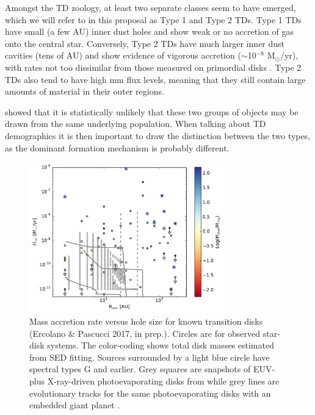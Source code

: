 \documentclass[10pt,fleqn,twoside]{article}
\begin{document}
\begin{highlight}
Amongst the TD zoology, at least two separate classes seem
to have emerged, which we will refer to in this proposal as Type 1 and
Type 2 TDs. Type 1 TDs have small (a few AU) inner dust holes and show weak or no accretion of
gas onto the central star. Conversely, Type
2 TDs have much larger inner dust cavities (tens of AU) and show evidence of vigorous accretion ($\sim$10$^{-8}$
M$_{\odot}$/yr), with rates not too dissimilar from those measured
on primordial disks \citep[e.g.,][]{2014A&A...568A..18M}.
Type 2 TDs also tend to have high mm flux levels, meaning that
they still contain large amounts of material in their outer
regions. 
\end{highlight}
\citet{2012MNRAS.426L..96O} showed that it is statistically
unlikely that these two groups of objects may be drawn from the same
underlying population. When talking about TD demographics it is then
important to draw the distinction between the two types, as the
dominant formation mechanism is probably different. 

\begin{figure}
\centerline{\includegraphics[width=0.75\textwidth]{figures/Macc_Rhole_Mdisk.pdf}}
\caption{\label{fig-macc-rhole-mdisc}
  Mass accretion rate versus hole size for known transition
  disks (Ercolano \& Pascucci 2017, in prep.). Circles are for
  observed star-disk systems. The color-coding shows total disk masses
  estimated from SED fitting. Sources surrounded by a
  light blue circle have spectral types G and earlier. Grey squares
  are snapshots of EUV- plus X-ray-driven photoevaporating disks from
  \citet{2011MNRAS.412...13O} while grey lines are evolutionary tracks for the
  same photoevaporating disks with an embedded giant planet 
  \citep{2013MNRAS.430.1392R}.} 
\end{figure}
\end{document}
